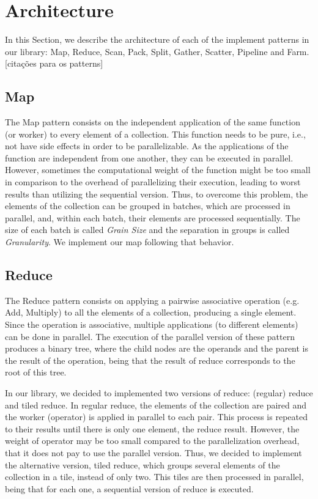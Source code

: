 \documentclass[conference,compsoc]{IEEEtran}
\begin{document}
\section{Architecture} \label{Architecture}

In this Section, we describe the architecture of each of the implement patterns in our library: Map, Reduce, Scan, Pack, Split, Gather, Scatter, Pipeline and Farm. [citações para os patterns]

\subsection{Map}
The Map pattern consists on the independent application of the same function (or worker) to every element of a collection. This function needs to be pure, i.e., not have side effects in order to be parallelizable. As the applications of the function are independent from one another, they can be executed in parallel.
However, sometimes the computational weight of the function might be too small in comparison to the overhead of parallelizing their execution, leading to worst results than utilizing the sequential version. Thus, to overcome this problem, the elements of the collection can be grouped in batches, which are processed in parallel, and, within each batch, their elements are processed sequentially. The size of each batch is called \emph{Grain Size} and the separation in groups is called \emph{Granularity}. We implement our map following that behavior.

\subsection{Reduce}
The Reduce pattern consists on applying a pairwise associative operation (e.g. Add, Multiply) to all the elements of a collection, producing a single element. Since the operation is associative, multiple applications (to different elements) can be done in parallel. The execution of the parallel version of these pattern produces a binary tree, where the child nodes are the operands and the parent is the result of the operation, being that the result of reduce corresponds to the root of this tree.

In our library, we decided to implemented two versions of reduce: (regular) reduce and tiled reduce. In regular reduce, the elements of the collection are paired and the worker (operator) is applied in parallel to each pair. This process is repeated to their results until there is only one element, the reduce result.
However, the weight of operator may be too small compared to the parallelization overhead, that it does not pay to use the parallel version.
Thus, we decided to implement the alternative version, tiled reduce, which groups several elements of the collection in a tile, instead of only two. This tiles are then processed in parallel, being that for each one, a sequential version of reduce is executed.
\end{document}
